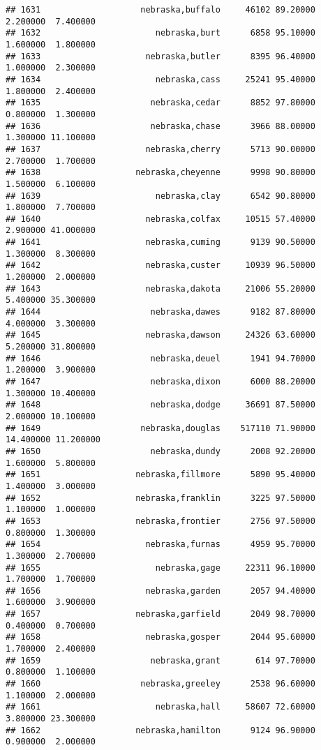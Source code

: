 \documentclass[
]{article}
\begin{document}
\begin{verbatim}
## 1631                    nebraska,buffalo     46102 89.20000  2.200000  7.400000
## 1632                       nebraska,burt      6858 95.10000  1.600000  1.800000
## 1633                     nebraska,butler      8395 96.40000  1.000000  2.300000
## 1634                       nebraska,cass     25241 95.40000  1.800000  2.400000
## 1635                      nebraska,cedar      8852 97.80000  0.800000  1.300000
## 1636                      nebraska,chase      3966 88.00000  1.300000 11.100000
## 1637                     nebraska,cherry      5713 90.00000  2.700000  1.700000
## 1638                   nebraska,cheyenne      9998 90.80000  1.500000  6.100000
## 1639                       nebraska,clay      6542 90.80000  1.800000  7.700000
## 1640                     nebraska,colfax     10515 57.40000  2.900000 41.000000
## 1641                     nebraska,cuming      9139 90.50000  1.300000  8.300000
## 1642                     nebraska,custer     10939 96.50000  1.200000  2.000000
## 1643                     nebraska,dakota     21006 55.20000  5.400000 35.300000
## 1644                      nebraska,dawes      9182 87.80000  4.000000  3.300000
## 1645                     nebraska,dawson     24326 63.60000  5.200000 31.800000
## 1646                      nebraska,deuel      1941 94.70000  1.200000  3.900000
## 1647                      nebraska,dixon      6000 88.20000  1.300000 10.400000
## 1648                      nebraska,dodge     36691 87.50000  2.000000 10.100000
## 1649                    nebraska,douglas    517110 71.90000 14.400000 11.200000
## 1650                      nebraska,dundy      2008 92.20000  1.600000  5.800000
## 1651                   nebraska,fillmore      5890 95.40000  1.400000  3.000000
## 1652                   nebraska,franklin      3225 97.50000  1.100000  1.000000
## 1653                   nebraska,frontier      2756 97.50000  0.800000  1.300000
## 1654                     nebraska,furnas      4959 95.70000  1.300000  2.700000
## 1655                       nebraska,gage     22311 96.10000  1.700000  1.700000
## 1656                     nebraska,garden      2057 94.40000  1.600000  3.900000
## 1657                   nebraska,garfield      2049 98.70000  0.400000  0.700000
## 1658                     nebraska,gosper      2044 95.60000  1.700000  2.400000
## 1659                      nebraska,grant       614 97.70000  0.800000  1.100000
## 1660                    nebraska,greeley      2538 96.60000  1.100000  2.000000
## 1661                       nebraska,hall     58607 72.60000  3.800000 23.300000
## 1662                   nebraska,hamilton      9124 96.90000  0.900000  2.000000

\end{verbatim}
\end{document}
